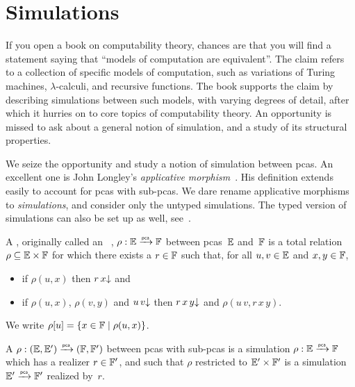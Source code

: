 \section{Simulations}
\label{sec:simulations}%

If you open a book on computability theory, chances are that you will find a statement saying that ``models of computation are equivalent''. The claim refers to a collection of specific models of computation, such as variations of Turing machines, $\lambda$-calculi, and recursive functions. The book supports the claim by describing simulations between such models, with varying degrees of detail, after which it hurries on to core topics of computability theory. An opportunity is missed to ask about a general notion of simulation, and a study of its structural properties.


We seize the opportunity and study a notion of simulation between pcas. An excellent one is John Longley's \emph{applicative morphism}~. His definition extends easily to account for pcas with sub-pcas. We dare rename applicative morphisms to \emph{simulations}, and consider only the untyped simulations. The typed version of simulations can also be set up as well, see~.

\begin{definition}
  \label{def:simulation}%
  A , originally called an ~\cite{Longley:94},
  $\rho: {\mathbb{E}} \xrightarrow{\scriptscriptstyle\mathsf{pca}}{} {\mathbb{F}}$ between pcas~${\mathbb{E}}$ and~${\mathbb{F}}$ is a total relation $\rho
  \subseteq {\mathbb{E}} \times {\mathbb{F}}$ for which there exists a  $r \in {\mathbb{F}}$
  such that, for all $u, v \in {\mathbb{E}}$ and $x, y \in {\mathbb{F}}$,
  \begin{itemize}
  \item if $\rho(u, x)$ then $r \, x{\downarrow}$ and
  \item if $\rho(u, x)$, $\rho(v, y)$ and $u \, v{\downarrow}$ then
    $r \, x \, y{\downarrow}$ and $\rho(u \, v, r \, x \, y)$.
  \end{itemize}
  We write $\rho[u] = \{x \in {\mathbb{F}} \mid \rho(u, x)\}$.

  A  $\rho: ({\mathbb{E}}, {\mathbb{E}'}) \xrightarrow{\scriptscriptstyle\mathsf{pca}}{} ({\mathbb{F}}, {\mathbb{F}'})$ between pcas with sub-pcas is a simulation
  $\rho : {\mathbb{E}} \xrightarrow{\scriptscriptstyle\mathsf{pca}}{} {\mathbb{F}}$ which has a realizer $r \in {\mathbb{F}'}$, and such that $\rho$ restricted to ${\mathbb{E}'} \times {\mathbb{F}'}$ is a simulation ${\mathbb{E}'} \xrightarrow{\scriptscriptstyle\mathsf{pca}}{} {\mathbb{F}'}$ realized by~$r$.
\end{definition}

